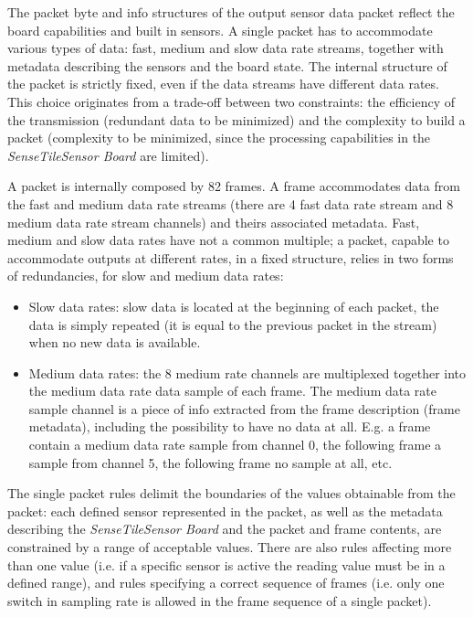 \documentclass[english]{lni}
\newcommand{\ST}{\emph{SenseTile}\xspace}
\newcommand{\SB}{\emph{Sensor Board}\xspace}
\newcommand{\STSB}{\ST \SB\xspace}
\begin{document}
The packet byte and info structures of the output sensor data packet reflect the board capabilities and built in sensors. 
A single packet has to accommodate various types of data: fast, medium and slow data rate streams, together with metadata describing the sensors and the board state.
The internal structure of the packet is strictly fixed, even if the data streams have different data rates. 
This choice originates from a trade-off between two constraints: the efficiency of the transmission (redundant data to be minimized) and the complexity to build a packet (complexity to be minimized, since the processing capabilities in the \STSB are limited). 

A packet is internally composed by 82 frames. 
A frame accommodates data from the fast and medium data rate streams (there are 4 fast data rate stream and 8 medium data rate stream channels) and theirs associated metadata.
Fast, medium and slow data rates have not a common multiple; a packet, capable to accommodate outputs at different rates, in a fixed structure, relies in two forms of redundancies, for slow and medium data rates:
\begin{itemize}
\item Slow data rates: slow data is located at the beginning of each packet, the data is simply repeated (it is equal to the previous packet in the stream) when no new data is available.
\item Medium data rates: the 8 medium rate channels are multiplexed together into the medium data rate data sample of each frame. The medium data rate sample channel is a piece of info extracted from the frame description (frame metadata), including the possibility to have no data at all. 
E.g. a frame contain a medium data rate sample from channel 0, the following frame a sample from channel 5, the following frame no sample at all, etc.
\end{itemize}

The single packet rules delimit the boundaries of the values obtainable from the packet: each defined sensor represented in the packet, as well as the metadata describing the \STSB and the packet and frame contents, are constrained by a range of acceptable values.
There are also rules affecting more than one value (i.e. if a specific sensor is active the reading value must be in a defined range), and rules specifying a correct sequence of frames (i.e. only one switch in sampling rate is allowed in the frame sequence of a single packet).
\end{document}
